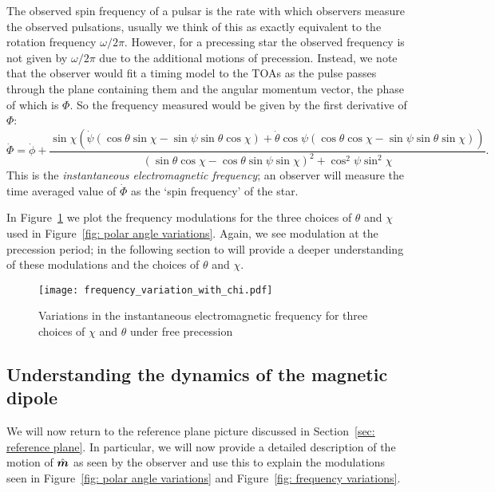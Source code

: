 \documentclass[../full_thesis/full_thesis.tex]{subfiles}
\begin{document}
The observed spin frequency of a pulsar is the rate with which observers measure the
observed pulsations, usually we think of this as exactly equivalent to the
rotation frequency $\omega/2\pi$. However, for a precessing star the observed
frequency is not given by $\omega/2\pi$ due to the additional motions of precession.
Instead, we note that the observer would fit a timing model to the TOAs as the
pulse passes through the plane containing them and the angular momentum vector,
the phase of which is $\Phi$. So the frequency measured would be given by the
first derivative of $\Phi$:
\begin{equation}
\dot{\Phi} = \dot{\phi}
+ \frac{\sin\chi \left(
\dot{\psi} (\cos\theta\sin\chi - \sin \psi \sin \theta \cos\chi) +
\dot{\theta} \cos\psi (\cos\theta\cos\chi - \sin \psi \sin \theta \sin\chi)\right)
}{(\sin\theta \cos \chi - \cos \theta \sin \psi \sin \chi)^{2} + \cos^{2}\psi \sin^{2} \chi}.
\label{eqn: Phi_dot}
\end{equation}
This is the \emph{instantaneous electromagnetic frequency}; an observer
will measure the time averaged value of $\dot{\Phi}$ as the `spin frequency' of
the star.

In Figure~\ref{fig: frequency variations} we plot the frequency modulations for
the three choices of $\theta$ and $\chi$ used in Figure~\ref{fig: polar angle variations}.
Again, we see modulation at the precession period; in the following section to
will provide a deeper understanding of these modulations and the choices of
$\theta$ and $\chi$.
\begin{figure}[htb]
\centering
  \texttt{[image: frequency\_variation\_with\_chi.pdf]}
\caption{Variations in the instantaneous electromagnetic frequency for three choices
of $\chi$ and $\theta$ under free precession}
\label{fig: frequency variations}
\end{figure}


\subsection{Understanding the dynamics of the magnetic dipole}
\label{sec: understanding the motion of m}

We will now return to the reference plane picture discussed in Section~\ref{sec:
reference plane}. In particular, we will now provide a detailed description of
the motion of $\hat{\boldsymbol{m}}$ as seen by the observer and use this to explain the
modulations seen in Figure~\ref{fig: polar angle variations} and Figure~\ref{fig:
frequency variations}.
\end{document}
